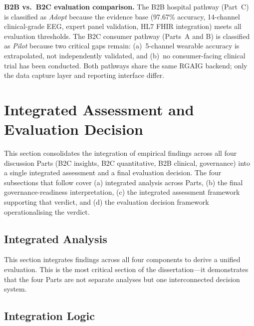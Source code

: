 \noindent\textbf{B2B vs.\ B2C evaluation comparison.} The B2B hospital pathway (Part~C) is classified as \textit{Adopt} because the evidence base (97.67\% accuracy, 14-channel clinical-grade EEG, expert panel validation, HL7 FHIR integration) meets all evaluation thresholds. The B2C consumer pathway (Parts~A and B) is classified as \textit{Pilot} because two critical gaps remain: (a)~5-channel wearable accuracy is extrapolated, not independently validated, and (b)~no consumer-facing clinical trial has been conducted. Both pathways share the same RGAIG backend; only the data capture layer and reporting interface differ.
\fi %

\section{Integrated Assessment and Evaluation Decision}
\label{sec:ch5_integrated_assessment_deployment}

\noindent This section consolidates the integration of empirical findings across all four discussion Parts (B2C insights, B2C quantitative, B2B clinical, governance) into a single integrated assessment and a final evaluation decision. The four subsections that follow cover (a) integrated analysis across Parts, (b) the final governance-readiness interpretation, (c) the integrated assessment framework supporting that verdict, and (d) the evaluation decision framework operationalising the verdict.

\subsection{Integrated Analysis}
\label{sec:ch5_integrated}

This section integrates findings across all four components to derive a unified evaluation. This is the most critical section of the dissertation---it demonstrates that the four Parts are not separate analyses but one interconnected decision system.

\subsection{Integration Logic}

